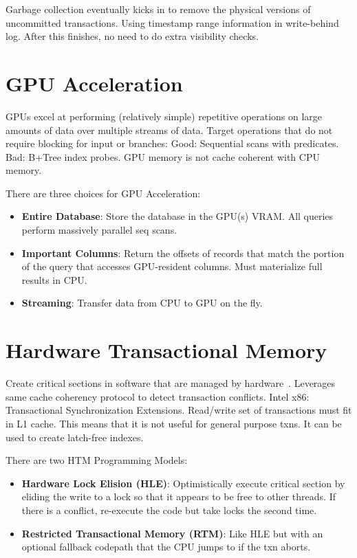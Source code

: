 \documentclass[11pt]{article}
\begin{document}
Garbage collection eventually kicks in to remove the physical versions of uncommitted transactions. Using timestamp range information in write-behind log. After this finishes, no need to do extra visibility checks.


\section{GPU Acceleration}
GPUs excel at performing (relatively simple) repetitive operations on large amounts of data over multiple streams of data. Target operations that do not require blocking for input or branches: Good: Sequential scans with predicates. Bad: B+Tree index probes. GPU memory is not cache coherent with CPU memory.

There are three choices for GPU Acceleration:
\begin{itemize}
	\item \textbf{Entire Database}:
	Store the database in the GPU(s) VRAM.
	All queries perform massively parallel seq scans.
	
	\item \textbf{Important Columns}:
	Return the offsets of records that match the portion of the query that accesses GPU-resident columns.
	Must materialize full results in CPU.
	
	\item \textbf{Streaming}:
	Transfer data from CPU to GPU on the fly. 
\end{itemize}


\section{Hardware Transactional Memory}
Create critical sections in software that are managed by hardware~\cite{Makreshanski2015}. Leverages same cache coherency protocol to detect transaction conflicts. Intel x86: Transactional Synchronization Extensions. Read/write set of transactions must fit in L1 cache. This means that it is not useful for general purpose txns. It can be used to create latch-free indexes.

There are two HTM Programming Models:
\begin{itemize}
	\item \textbf{Hardware Lock Elision (HLE)}:
	Optimistically execute critical section by eliding the write to a lock so that it appears to be free to other threads.
	If there is a conflict, re-execute the code but take locks the second time.
	
	\item \textbf{Restricted Transactional Memory (RTM)}:
	Like HLE but with an optional fallback codepath that the CPU jumps to if the txn aborts.
\end{itemize}


\newpage


\end{document}
